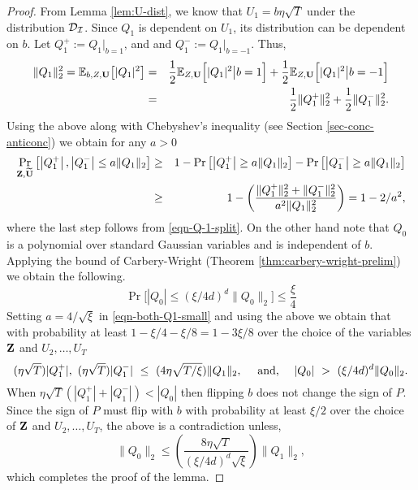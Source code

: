 \begin{proof}
		From Lemma \ref{lem:U-dist}, we know that $U_1 = b\eta\sqrt{T}$ under the distribution $\mathcal{D}_{\mathcal{I}}$.  
		Since $Q_1$ is dependent on $U_1$, its distribution can be dependent on $b$. Let $Q^+_1 :=  Q_1|_{b=1}$, and  and $Q^{-}_1 := Q_1|_{b=-1}$. Thus,
		\begin{eqnarray}
		\|Q_1\|^2_2 = \E_{b,Z,{\bf U}}\big[|Q_1|^2\big] &=& \frac{1}{2}\E_{Z,{\bf U}}\Big[|Q_1|^2 \big| b= 1 \Big] + \frac{1}{2}\E_{Z,{\bf U}}\Big[|Q_1|^2 \big| b= -1 \Big] \nonumber \\  &=& \frac{1}{2}\|Q^+_1\|^2_2 + \frac{1}{2}\|Q^-_1\|^2_2. \label{eqn-Q-1-split}
		\end{eqnarray}
		Using the above along with Chebyshev's inequality (see Section \ref{sec-conc-anticonc}) we obtain for any $a > 0$
	\begin{eqnarray}
	\Pr_{\mbf{Z}, \Wu} \left[\left|Q^+_1\right|, \left|Q^-_1\right|  \leq  a\|Q_1\|_2 \right] 
	& \geq & 1 - \Pr\left[\left|Q^+_1\right| \geq  a\|Q_1\|_2 \right] - \Pr\left[\left|Q^-_1\right| \geq  a\|Q_1\|_2 \right] \nonumber \\
	& \geq & 1 - \left(\frac{\|Q^+_1\|^2_2 + \|Q^-_1\|^2_2}{a^2\|Q_1\|_2^2}\right) = 1 - 2/a^2, \label{eqn-both-Q1-small}
	\end{eqnarray}
where the last step follows from   \eqref{eqn-Q-1-split}.
On the other hand note that $Q_0$ is a polynomial over standard Gaussian variables and is independent of $b$. 
Applying the bound of Carbery-Wright (Theorem \ref{thm:carbery-wright-prelim}) 
we obtain the following.
	\begin{equation}
	\Pr\Big[|Q_0| \le (\xi/4d)^d\|Q_0\|_2\Big] \le \frac{\xi}{4} 
	\end{equation}
Setting $a = 4/\sqrt{\xi}$ in   \eqref{eqn-both-Q1-small} and using the above we obtain that with probability at least $1 - \xi/4 - \xi/8 = 1 - 3\xi/8$ over the choice of the variables
$\mbf{Z}$ and $U_2,\dots, U_T$
$$(\eta \sqrt{T})|Q^+_1|, \  (\eta \sqrt{T})|Q^-_1| \ \leq \ (4\eta\sqrt{T/\xi})\|Q_1\|_2, \ \ \ \ \tn{and,} \ \ \ \ |Q_0| \ > \ (\xi/4d)^d\|Q_0\|_2.$$
When $\eta \sqrt{T}(|Q^+_1| + |Q^-_1|) < |Q_0|$ then flipping $b$ does not change the sign of $P$.
Since the sign of $P$ must flip with $b$ with probability at least $\xi/2$ over the choice of $\mbf{Z}$ and $U_2,\dots, U_T$, the above is a contradiction unless,
$$ \|Q_0\|_2 \leq \left(\frac{8\eta\sqrt{T}}{(\xi/4d)^{d}\sqrt{\xi}}\right)  \|Q_1\|_2,$$
which completes the proof of the lemma.
\end{proof}


